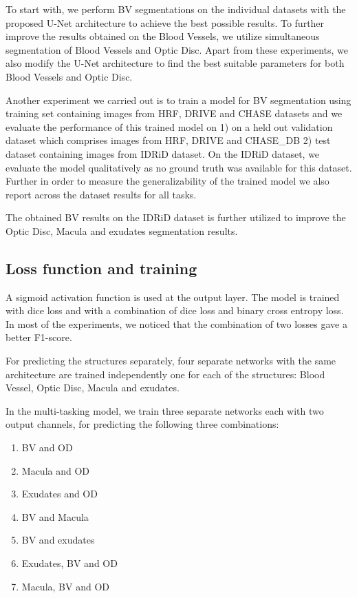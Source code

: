 \documentclass[utf8]{FrontiersinHarvard} %
\begin{document}
To start with, we perform BV segmentations on the individual datasets with the proposed U-Net architecture to achieve the best possible results. To further improve the results obtained on the Blood Vessels, we utilize simultaneous segmentation of Blood Vessels and Optic Disc. Apart from these experiments, we also modify the U-Net architecture to find the best suitable parameters for both Blood Vessels and Optic Disc.

Another experiment we carried out is to train a model for BV segmentation using training set containing images from HRF, DRIVE and CHASE datasets and we evaluate the performance of this trained model on  1) on a held out validation dataset which comprises images from HRF, DRIVE and CHASE\_DB  2) test dataset containing images from IDRiD dataset. On the IDRiD dataset, we evaluate the model qualitatively as no ground truth was available for this dataset. Further in order to measure the generalizability of the trained model we also report across the dataset results for all tasks.

The obtained BV results on the IDRiD dataset is further utilized to improve the Optic Disc, Macula and exudates segmentation results.

\subsection{Loss function and training}\label{sec:loss_and_training}
A sigmoid activation function is used at the output layer. The model is trained with dice loss and  with a combination of dice loss and binary cross entropy loss. In most of the experiments, we noticed that the combination of two losses gave a better F1-score.

For predicting the structures separately, four separate networks with the same architecture are trained independently one for each of the structures: Blood Vessel, Optic Disc, Macula and exudates.

In the multi-tasking model, we train three separate networks each with two output channels, for predicting the following three combinations:
\begin{enumerate}
\item BV and OD
\item Macula and OD
\item Exudates and OD
\item BV and Macula
\item BV and exudates
\item Exudates, BV and OD
\item Macula, BV and OD
\end{enumerate}
\end{document}
